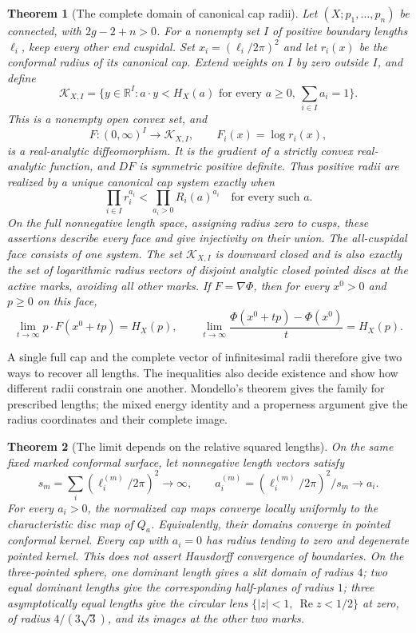 \documentclass[11pt,a4paper]{article}
\newtheorem{theorem}{Theorem}[section]
\theoremstyle{definition}
\newcommand{\R}{\mathbb R}
\begin{document}
\begin{theorem}[The complete domain of canonical cap radii]\label{thm:radius-map}
Let $(X;p_1,\ldots,p_n)$ be connected, with $2g-2+n>0$. For a nonempty set $I$ of positive boundary lengths $\ell_i$, keep every other end cuspidal. Set $x_i=(\ell_i/2\pi)^2$ and let $r_i(x)$ be the conformal radius of its canonical cap. Extend weights on $I$ by zero outside $I$, and define
\[
 \mathcal K_{X,I}=\{y\in\R^I:a\cdot y<H_X(a)
       \text{ for every }a\ge0,\ \sum_{i\in I}a_i=1\}.
\]
This is a nonempty open convex set, and
\[
 F:(0,\infty)^I\longrightarrow\mathcal K_{X,I},\qquad
 F_i(x)=\log r_i(x),
\]
is a real-analytic diffeomorphism. It is the gradient of a strictly convex real-analytic function, and $DF$ is symmetric positive definite. Thus positive radii are realized by a unique canonical cap system exactly when
\[
            \prod_{i\in I}r_i^{a_i}
             <\prod_{a_i>0}R_i(a)^{a_i}
        \quad\text{for every such }a.
\]
On the full nonnegative length space, assigning radius zero to cusps, these assertions describe every face and give injectivity on their union. The all-cuspidal face consists of one system. The set $\mathcal K_{X,I}$ is downward closed and is also exactly the set of logarithmic radius vectors of disjoint analytic closed pointed discs at the active marks, avoiding all other marks. If $F=\nabla\Phi$, then for every $x^0>0$ and $p\ge0$ on this face,
\[
 \lim_{t\to\infty}p\cdot F(x^0+tp)=H_X(p),\qquad
 \lim_{t\to\infty}\frac{\Phi(x^0+tp)-\Phi(x^0)}t=H_X(p).
\]
\end{theorem}

A single full cap and the complete vector of infinitesimal radii therefore give two ways to recover all lengths. The inequalities also decide existence and show how different radii constrain one another. Mondello's theorem gives the family for prescribed lengths; the mixed energy identity and a properness argument give the radius coordinates and their complete image.

\begin{theorem}[The limit depends on the relative squared lengths]\label{thm:radius-limit}
On the same fixed marked conformal surface, let nonnegative length vectors satisfy
\[
 s_m=\sum_i(\ell_i^{(m)}/2\pi)^2\longrightarrow\infty,
 \qquad a_i^{(m)}=(\ell_i^{(m)}/2\pi)^2/s_m\longrightarrow a_i.
\]
For every $a_i>0$, the normalized cap maps converge locally uniformly to the characteristic disc map of $Q_a$. Equivalently, their domains converge in pointed conformal kernel. Every cap with $a_i=0$ has radius tending to zero and degenerate pointed kernel. This does not assert Hausdorff convergence of boundaries. On the three-pointed sphere, one dominant length gives a slit domain of radius $4$; two equal dominant lengths give the corresponding half-planes of radius $1$; three asymptotically equal lengths give the circular lens $\{|z|<1,\ \operatorname{Re}z<1/2\}$ at zero, of radius $4/(3\sqrt3)$, and its images at the other two marks.
\end{theorem}
\end{document}
